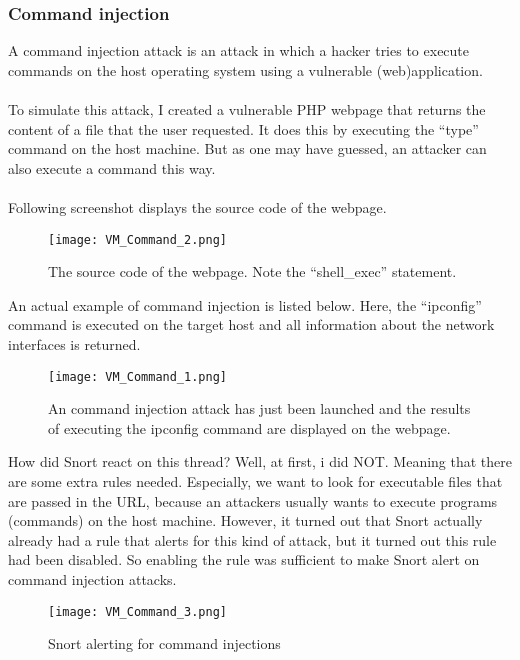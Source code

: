 \clearpage

\subsubsection{Command injection}

A command injection attack is an attack in which a hacker tries to execute commands on the host operating system using a vulnerable (web)application. \\ \\
To simulate this attack, I created a vulnerable PHP webpage that returns the content of a file that the user requested. It does this by executing the ``type'' command on the host machine. But as one may have guessed, an attacker can also execute a command this way.  \\ \\
Following screenshot displays the source code of the webpage.
\begin{figure}[h]
    \centering
    \texttt{[image: VM\_Command\_2.png]}
    \caption{The source code of the webpage. Note the ``shell\_exec'' statement. \\}
\end{figure}

An actual example of command injection is listed below. Here, the ``ipconfig'' command is executed on the target host and all information about the network interfaces is returned.
\begin{figure}[h]
    \centering
    \texttt{[image: VM\_Command\_1.png]}
    \caption{An command injection attack has just been launched and the results of executing the ipconfig command are displayed on the webpage.}
\end{figure}
\clearpage
How did Snort react on this thread? Well, at first, i did NOT. Meaning that there are some extra rules needed.
Especially, we want to look for executable files that are passed in the URL, because an attackers usually wants to execute programs (commands) on the host machine. However, it turned out that Snort actually already had a rule that alerts for this kind of attack, but it turned out this rule had been disabled. So enabling the rule was sufficient to make Snort alert on command injection attacks.
\begin{figure}[h]
    \centering
    \texttt{[image: VM\_Command\_3.png]}
    \caption{Snort alerting for command injections}
\end{figure}

\clearpage

